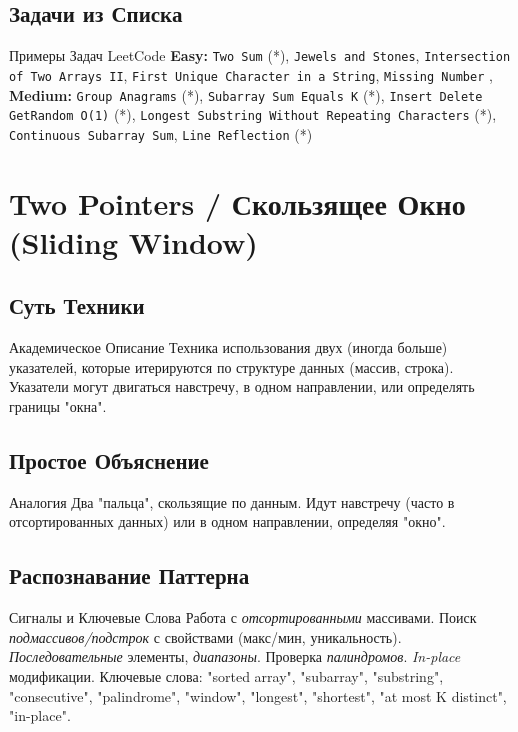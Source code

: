 \subsection{Задачи из Списка}
\begin{myblock}{Примеры Задач LeetCode}
    \textbf{Easy:} \texttt{Two Sum} (*), \texttt{Jewels and Stones}, \texttt{Intersection of Two Arrays II}, \texttt{First Unique Character in a String}, \texttt{Missing Number} \sep
    \textbf{Medium:} \texttt{Group Anagrams} (*), \texttt{Subarray Sum Equals K} (*), \texttt{Insert Delete GetRandom O(1)} (*), \texttt{Longest Substring Without Repeating Characters} (*), \texttt{Continuous Subarray Sum}, \texttt{Line Reflection} (*)
\end{myblock}

\section{Two Pointers / Скользящее Окно (Sliding Window)}

\subsection{Суть Техники}
\begin{myblock}{Академическое Описание}
    Техника использования двух (иногда больше) указателей, которые итерируются по структуре данных (массив, строка). Указатели могут двигаться навстречу, в одном направлении, или определять границы "окна".
\end{myblock}

\subsection{Простое Объяснение}
\begin{myblock}{Аналогия}
    Два "пальца", скользящие по данным. Идут навстречу (часто в отсортированных данных) или в одном направлении, определяя "окно".
\end{myblock}

\subsection{Распознавание Паттерна}
\begin{myblock}{Сигналы и Ключевые Слова}
    Работа с \emph{отсортированными} массивами. Поиск \emph{подмассивов/подстрок} с свойствами (макс/мин, уникальность). \emph{Последовательные} элементы, \emph{диапазоны}. Проверка \emph{палиндромов}. \emph{In-place} модификации. \newline
    Ключевые слова: "sorted array", "subarray", "substring", "consecutive", "palindrome", "window", "longest", "shortest", "at most K distinct", "in-place".
\end{myblock}

